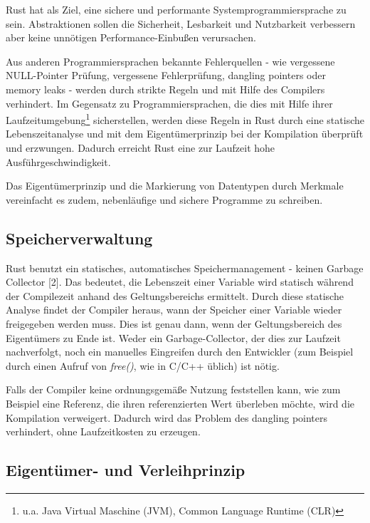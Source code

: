 \begin{multicols}{2}
Rust hat als Ziel, eine sichere und performante Systemprogrammiersprache zu sein.
Abstraktionen sollen die Sicherheit, Lesbarkeit und Nutzbarkeit verbessern aber keine unnötigen Performance-Einbußen verursachen.

\bildI

Aus anderen Programmiersprachen bekannte Fehlerquellen - wie vergessene NULL-Pointer Prüfung, vergessene Fehlerprüfung, dangling pointers oder memory leaks -  werden durch strikte Regeln und mit Hilfe des Compilers verhindert.
Im Gegensatz zu Programmiersprachen, die dies mit Hilfe ihrer Laufzeitumgebung\footnote{u.a. Java Virtual Maschine (JVM), Common Language Runtime (CLR)} sicherstellen, werden diese Regeln in Rust durch eine statische Lebenszeitanalyse und mit dem Eigentümerprinzip bei der Kompilation überprüft und erzwungen.
Dadurch erreicht Rust eine zur Laufzeit hohe Ausführgeschwindigkeit.

Das Eigentümerprinzip und die Markierung von Datentypen durch Merkmale vereinfacht es zudem, nebenläufige und sichere Programme zu schreiben.


\subsection*{Speicherverwaltung}

Rust benutzt ein statisches, automatisches Speichermanagement - keinen Garbage Collector [2].
Das bedeutet, die Lebenszeit einer Variable wird statisch während der Compilezeit anhand des Geltungsbereichs ermittelt.
Durch diese statische Analyse findet der Compiler heraus, wann der Speicher einer Variable wieder freigegeben werden muss.
Dies ist genau dann, wenn der Geltungsbereich des Eigentümers zu Ende ist.
Weder ein Garbage-Collector, der dies zur Laufzeit nachverfolgt, noch ein manuelles Eingreifen durch den Entwickler (zum Beispiel durch einen Aufruf von \textit{free()}, wie in C/C++ üblich) ist nötig.

Falls der Compiler keine ordnungsgemäße Nutzung feststellen kann, wie zum Beispiel eine Referenz, die ihren referenzierten Wert überleben möchte, wird die Kompilation verweigert.
Dadurch wird das Problem des dangling pointers verhindert, ohne Laufzeitkosten zu erzeugen.

\subsection*{Eigentümer- und Verleihprinzip}


\end{multicols}

